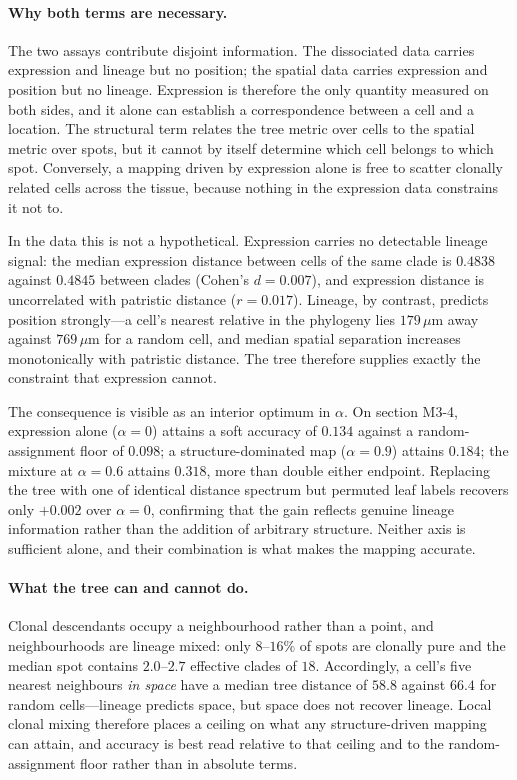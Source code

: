 
\paragraph{Why both terms are necessary.}
The two assays contribute disjoint information. The dissociated data carries expression and
lineage but no position; the spatial data carries expression and position but no lineage.
Expression is therefore the only quantity measured on both sides, and it alone can establish a
correspondence between a cell and a location. The structural term relates the tree metric over
cells to the spatial metric over spots, but it cannot by itself determine which cell belongs to
which spot. Conversely, a mapping driven by expression alone is free to scatter clonally related
cells across the tissue, because nothing in the expression data constrains it not to.

In the \petracer{} data this is not a hypothetical. Expression carries no detectable lineage
signal: the median expression distance between cells of the same clade is $0.4838$ against
$0.4845$ between clades (Cohen's $d = 0.007$), and expression distance is uncorrelated with
patristic distance ($r = 0.017$). Lineage, by contrast, predicts position strongly---a cell's
nearest relative in the phylogeny lies $179\,\mu$m away against $769\,\mu$m for a random cell,
and median spatial separation increases monotonically with patristic distance. The tree
therefore supplies exactly the constraint that expression cannot.

The consequence is visible as an interior optimum in $\alpha$. On section M3-4, expression alone
($\alpha = 0$) attains a soft accuracy of $0.134$ against a random-assignment floor of $0.098$;
a structure-dominated map ($\alpha = 0.9$) attains $0.184$; the mixture at $\alpha = 0.6$ attains
$0.318$, more than double either endpoint. Replacing the tree with one of identical distance
spectrum but permuted leaf labels recovers only $+0.002$ over $\alpha = 0$, confirming that the
gain reflects genuine lineage information rather than the addition of arbitrary structure.
Neither axis is sufficient alone, and their combination is what makes the mapping accurate.

\paragraph{What the tree can and cannot do.}
Clonal descendants occupy a neighbourhood rather than a point, and neighbourhoods are lineage
mixed: only $8$--$16\%$ of spots are clonally pure and the median spot contains $2.0$--$2.7$
effective clades of $18$. Accordingly, a cell's five nearest neighbours \emph{in space} have a
median tree distance of $58.8$ against $66.4$ for random cells---lineage predicts space, but
space does not recover lineage. Local clonal mixing therefore places a ceiling on what any
structure-driven mapping can attain, and accuracy is best read relative to that ceiling and to
the random-assignment floor rather than in absolute terms.
